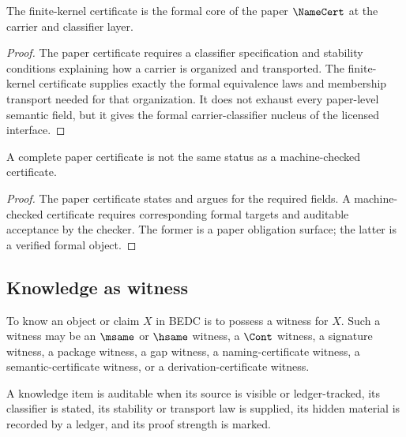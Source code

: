 \begin{theorem}
\label{thm:philosophy-kernel-namecert-classifier-core}
The finite-kernel certificate is the formal core of the paper
\(\NameCert\) at the carrier and classifier layer.
\end{theorem}
\begin{proof}
The paper certificate requires a classifier specification and stability
conditions explaining how a carrier is organized and transported. The
finite-kernel certificate supplies exactly the formal equivalence laws
and membership transport needed for that organization. It does not
exhaust every paper-level semantic field, but it gives the formal
carrier-classifier nucleus of the licensed interface.
\end{proof}

\begin{corollary}
\label{cor:philosophy-paper-completion-not-machine-checking}
A complete paper certificate is not the same status as a
machine-checked certificate.
\end{corollary}
\begin{proof}
The paper certificate states and argues for the required fields. A
machine-checked certificate requires corresponding formal targets and
auditable acceptance by the checker. The former is a paper obligation
surface; the latter is a verified formal object.
\end{proof}

\subsection{Knowledge as witness}
\label{subsec:philosophy-knowledge-as-witness}

\begin{definition}
\label{def:philosophy-bedc-knowledge}
To know an object or claim \(X\) in BEDC is to possess a witness for
\(X\). Such a witness may be an \(\msame\) or \(\hsame\) witness, a
\(\Cont\) witness, a signature witness, a package witness, a gap
witness, a naming-certificate witness, a semantic-certificate witness,
or a derivation-certificate witness.
\end{definition}

\begin{definition}
\label{def:philosophy-auditable-knowledge}
A knowledge item is auditable when its source is visible or
ledger-tracked, its classifier is stated, its stability or transport
law is supplied, its hidden material is recorded by a ledger, and its
proof strength is marked.
\end{definition}

